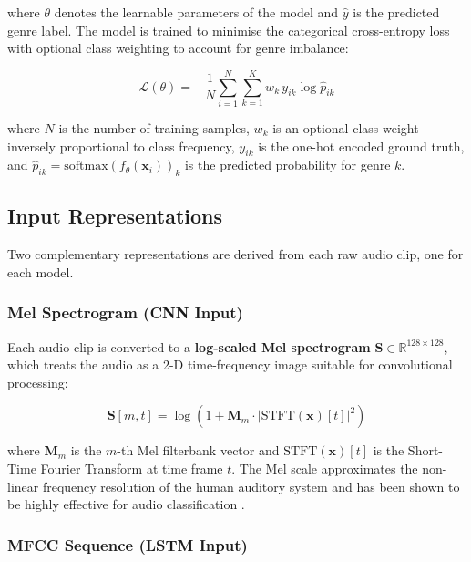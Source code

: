\documentclass[12pt, a4paper]{article}
\begin{document}
where $\theta$ denotes the learnable parameters of the model and $\hat{y}$ is the
predicted genre label. The model is trained to minimise the categorical cross-entropy
loss with optional class weighting to account for genre imbalance:

\begin{equation}
    \mathcal{L}(\theta) = -\frac{1}{N} \sum_{i=1}^{N} \sum_{k=1}^{K}
    w_k \, y_{ik} \log \hat{p}_{ik}
    \label{eq:loss}
\end{equation}

where $N$ is the number of training samples, $w_k$ is an optional class weight
inversely proportional to class frequency, $y_{ik}$ is the one-hot encoded ground truth,
and $\hat{p}_{ik} = \text{softmax}(f_\theta(\mathbf{x}_i))_k$ is the predicted
probability for genre $k$.

\subsection{Input Representations}

Two complementary representations are derived from each raw audio clip, one for each
model.

\subsubsection{Mel Spectrogram (CNN Input)}

Each audio clip is converted to a \textbf{log-scaled Mel spectrogram} $\mathbf{S}
\in \mathbb{R}^{128 \times 128}$, which treats the audio as a 2-D time-frequency
image suitable for convolutional processing:

\begin{equation}
    \mathbf{S}[m, t] = \log\!\left(1 + \mathbf{M}_m \cdot |\text{STFT}(\mathbf{x})[t]|^2\right)
    \label{eq:melspec}
\end{equation}

where $\mathbf{M}_m$ is the $m$-th Mel filterbank vector and $\text{STFT}(\mathbf{x})[t]$
is the Short-Time Fourier Transform at time frame $t$. The Mel scale approximates
the non-linear frequency resolution of the human auditory system and has been shown to
be highly effective for audio classification \citep{hershey2017cnn}.

\subsubsection{MFCC Sequence (LSTM Input)}
\end{document}
